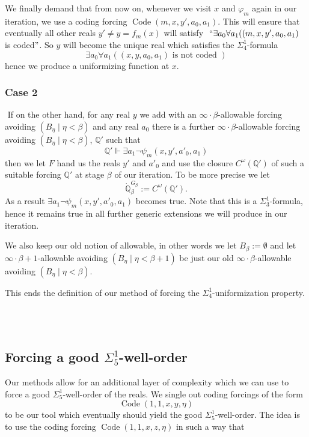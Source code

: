 \documentclass[a4paper,11pt]{article}
\newcommand{\forceQ}{\mathbb{Q}}
\begin{document}
We finally demand that from now on, whenever we visit $x$ and $\varphi_m$ again in our iteration, we use a coding forcing $\operatorname{Code} (m,x,y',a_0,a_1)$. This will ensure that eventually all other reals $y'\ne y=f_m(x)$ will satisfy
    ﻿
    $``\exists a_0 \forall a_1 ((m,x,y',a_0,a_1)$ is coded$"$. So $y$ will become the unique real which satisfies the $\Sigma^1_4$-formula
\[ \exists a_0 \forall a_1 ((x,y,a_0,a_1) \text{ is not coded } ) \]
hence we produce a uniformizing function at $x$.
    ﻿
    \subsubsection{Case 2}
    ﻿
    If on the other hand, for any real $y$ we add with an $\infty \cdot \beta$-allowable forcing avoiding $(B_{\eta} \mid \eta < \beta)$ and any real $a_0$ there is a further $\infty \cdot \beta$-allowable forcing avoiding $(B_{\eta} \mid \eta < \beta)$,  $\forceQ'$ such that
    ﻿
    \[ \forceQ' \Vdash \exists a_1 \lnot \psi_m (x,y',a'_0,a_1) \]
    ﻿then we let $F$ hand us the reals $y'$ and $a'_0$ and use the closure $C^{\omega} (\forceQ')$ of such a suitable forcing $\forceQ'$ at stage $\beta$ of our iteration.
To be more precise we let
\[ \dot{\forceQ}_{\beta}^{G_{\beta}} := C^{\omega} (\forceQ').\]  As a result $\exists a_1 \lnot \psi_m (x,y',a'_0,a_1)$ becomes true. Note that this is a $\Sigma^1_3$-formula, hence it remains true in all further generic extensions we will produce in our iteration.  

We also keep our old notion of allowable, in other words we let $B_{\beta}:= \emptyset$ and let $\infty \cdot \beta+1$-allowable avoiding $(B_{\eta} \mid \eta < \beta+1)$ be just our old $\infty \cdot \beta$-allowable avoiding $(B_{\eta} \mid \eta < \beta)$.


This ends the definition of our method of forcing the $\Sigma^1_4$-uniformization property.
    ﻿
    ﻿
  
    ﻿
    \subsection{Forcing  a good \texorpdfstring{$\Sigma^1_5$}{Sigma15}-well-order}
   Our methods allow for an additional layer of complexity  which we can use to force a good $\Sigma^1_5$-well-order of the reals.
We single out coding forcings of the form
\[ \operatorname{Code} (1,1,x,y,\eta) \]
to be our tool which eventually should yield the good $\Sigma^1_5$-well-order.
The idea is to use the coding forcing $\operatorname{Code} (1,1,x,z,\eta)$ in such a way that 
\end{document}
